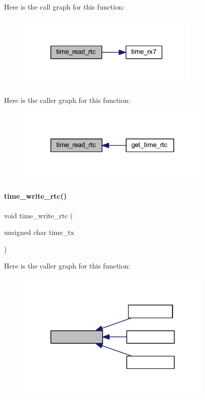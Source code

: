 Here is the call graph for this function\+:
\nopagebreak
\begin{figure}[H]
\begin{center}
\leavevmode
\includegraphics[width=246pt]{a00041_addeadab81b94cc879a2d7f1310fad7cd_cgraph}
\end{center}
\end{figure}
Here is the caller graph for this function\+:
\nopagebreak
\begin{figure}[H]
\begin{center}
\leavevmode
\includegraphics[width=263pt]{a00041_addeadab81b94cc879a2d7f1310fad7cd_icgraph}
\end{center}
\end{figure}
\mbox{\label{a00041_a67147f11d1f34a31e84b38dd81ccb553}} 
\paragraph{time\+\_\+write\+\_\+rtc()}
{\footnotesize\ttfamily void time\+\_\+write\+\_\+rtc (\begin{DoxyParamCaption}\item[{unsigned char}]{time\+\_\+tx }\end{DoxyParamCaption})}

Here is the caller graph for this function\+:
\nopagebreak
\begin{figure}[H]
\begin{center}
\leavevmode
\includegraphics[width=264pt]{a00041_a67147f11d1f34a31e84b38dd81ccb553_icgraph}
\end{center}
\end{figure}
